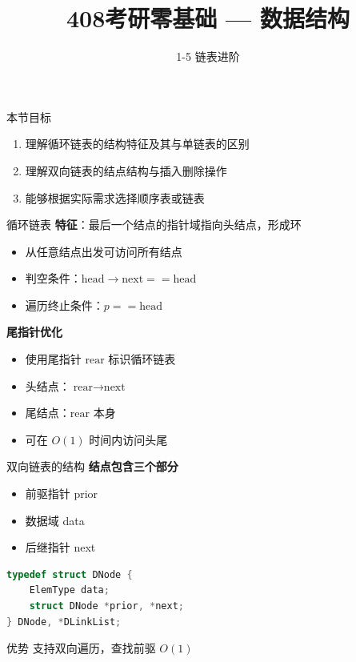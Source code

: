 \documentclass[10pt, aspectratio=169]{beamer}
\title{408考研零基础 --- 数据结构}
\subtitle{1-5 链表进阶}
\author{}
\date{}
\begin{document}
\begin{frame}{本节目标}
    \begin{enumerate}
        \item 理解循环链表的结构特征及其与单链表的区别
        \item 理解双向链表的结点结构与插入删除操作
        \item 能够根据实际需求选择顺序表或链表
    \end{enumerate}
\end{frame}

\begin{frame}{循环链表}
    \textbf{特征}：最后一个结点的指针域指向头结点，形成环
    \vspace{0.5em}
    \begin{itemize}
        \item 从任意结点出发可访问所有结点
        \item 判空条件：$\text{head} \to \text{next} == \text{head}$
        \item 遍历终止条件：$p == \text{head}$
    \end{itemize}
    \vspace{0.5em}
    \textbf{尾指针优化}
    \begin{itemize}
        \item 使用尾指针 $\text{rear}$ 标识循环链表
        \item 头结点：$\text{rear} \to \text{next}$
        \item 尾结点：$\text{rear}$ 本身
        \item 可在 $O(1)$ 时间内访问头尾
    \end{itemize}
\end{frame}

\begin{frame}[fragile]{双向链表的结构}
    \textbf{结点包含三个部分}
    \begin{itemize}
        \item 前驱指针 prior
        \item 数据域 data
        \item 后继指针 next
    \end{itemize}
    \vspace{0.5em}
    \begin{lstlisting}[language=C, basicstyle=\ttfamily\small]
typedef struct DNode {
    ElemType data;
    struct DNode *prior, *next;
} DNode, *DLinkList;
    \end{lstlisting}
    \vspace{0.5em}
    \begin{block}{优势}
        支持双向遍历，查找前驱 $O(1)$
    \end{block}
\end{frame}
\end{document}

